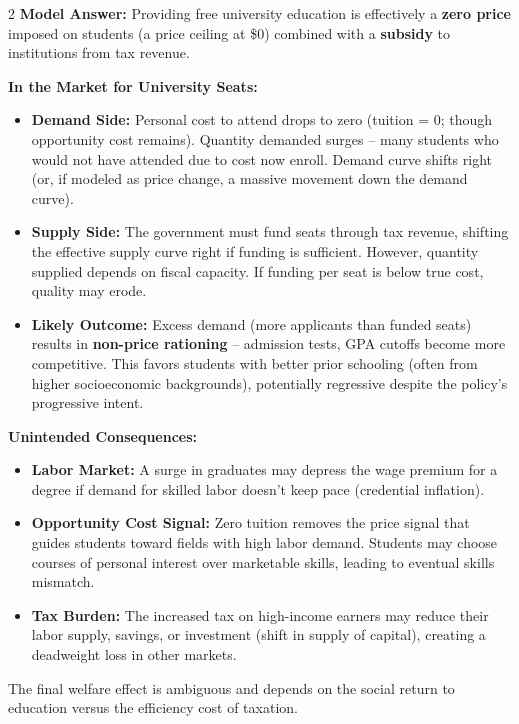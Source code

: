 \documentclass[10pt,a4paper]{article}
\begin{document}
\begin{multicols}{2}
\vspace{0.1cm}
\textbf{Model Answer:}
Providing free university education is effectively a \textbf{zero price} imposed on students (a price ceiling at \$0) combined with a \textbf{subsidy} to institutions from tax revenue.

\textbf{In the Market for University Seats:}
\begin{itemize}[leftmargin=*,nosep]
    \item \textbf{Demand Side:} Personal cost to attend drops to zero (tuition = 0; though opportunity cost remains). Quantity demanded surges -- many students who would not have attended due to cost now enroll. Demand curve shifts right (or, if modeled as price change, a massive movement down the demand curve).
    \item \textbf{Supply Side:} The government must fund seats through tax revenue, shifting the effective supply curve right if funding is sufficient. However, quantity supplied depends on fiscal capacity. If funding per seat is below true cost, quality may erode.
    \item \textbf{Likely Outcome:} Excess demand (more applicants than funded seats) results in \textbf{non-price rationing} -- admission tests, GPA cutoffs become more competitive. This favors students with better prior schooling (often from higher socioeconomic backgrounds), potentially regressive despite the policy's progressive intent.
\end{itemize}
\textbf{Unintended Consequences:}
\begin{itemize}[leftmargin=*,nosep]
    \item \textbf{Labor Market:} A surge in graduates may depress the wage premium for a degree if demand for skilled labor doesn't keep pace (credential inflation).
    \item \textbf{Opportunity Cost Signal:} Zero tuition removes the price signal that guides students toward fields with high labor demand. Students may choose courses of personal interest over marketable skills, leading to eventual skills mismatch.
    \item \textbf{Tax Burden:} The increased tax on high-income earners may reduce their labor supply, savings, or investment (shift in supply of capital), creating a deadweight loss in other markets.
\end{itemize}
The final welfare effect is ambiguous and depends on the social return to education versus the efficiency cost of taxation.

\vspace{0.2cm}


\end{multicols}
\end{document}

